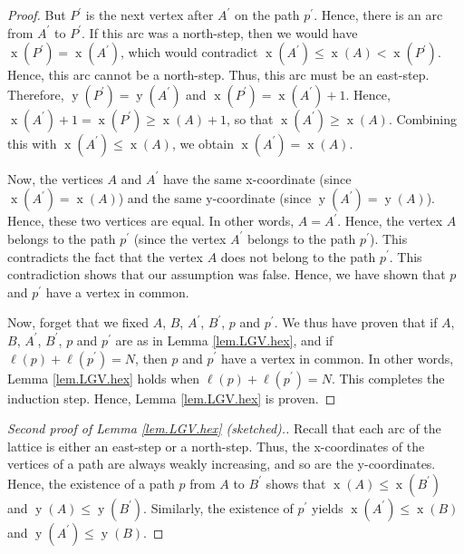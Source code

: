 \documentclass[reqno]{amsart}
\newcommand{\0}{\phantom{c}}
\newenvironment{verlong}{}{}
\theoremstyle{plain}
\theoremstyle{definition}
\numberwithin{equation}{section}
\begin{document}
\begin{verlong}
\begin{proof}
But $P^{\prime}$ is the next vertex after $A^{\prime}$ on the path $p^{\prime
}$. Hence, there is an arc from $A^{\prime}$ to $P^{\prime}$. If this arc was
a north-step, then we would have $\operatorname*{x}\left(  P^{\prime}\right)
=\operatorname*{x}\left(  A^{\prime}\right)  $, which would contradict
$\operatorname*{x}\left(  A^{\prime}\right)  \leq\operatorname*{x}\left(
A\right)  <\operatorname*{x}\left(  P^{\prime}\right)  $. Hence, this arc
cannot be a north-step. Thus, this arc must be an east-step. Therefore,
$\operatorname*{y}\left(  P^{\prime}\right)  =\operatorname*{y}\left(
A^{\prime}\right)  $ and $\operatorname*{x}\left(  P^{\prime}\right)
=\operatorname*{x}\left(  A^{\prime}\right)  +1$. Hence, $\operatorname*{x}%
\left(  A^{\prime}\right)  +1=\operatorname*{x}\left(  P^{\prime}\right)
\geq\operatorname*{x}\left(  A\right)  +1$, so that $\operatorname*{x}\left(
A^{\prime}\right)  \geq\operatorname*{x}\left(  A\right)  $. Combining this
with $\operatorname*{x}\left(  A^{\prime}\right)  \leq\operatorname*{x}\left(
A\right)  $, we obtain $\operatorname*{x}\left(  A^{\prime}\right)
=\operatorname*{x}\left(  A\right)  $.

Now, the vertices $A$ and $A^{\prime}$ have the same x-coordinate (since
$\operatorname*{x}\left(  A^{\prime}\right)  =\operatorname*{x}\left(
A\right)  $) and the same y-coordinate (since $\operatorname*{y}\left(
A^{\prime}\right)  =\operatorname*{y}\left(  A\right)  $). Hence, these two
vertices are equal. In other words, $A=A^{\prime}$. Hence, the vertex $A$
belongs to the path $p^{\prime}$ (since the vertex $A^{\prime}$ belongs to the
path $p^{\prime}$). This contradicts the fact that the vertex $A$ does not
belong to the path $p^{\prime}$. This contradiction shows that our assumption
was false. Hence, we have shown that $p$ and $p^{\prime}$ have a vertex in common.

Now, forget that we fixed $A$, $B$, $A^{\prime}$, $B^{\prime}$, $p$ and
$p^{\prime}$. We thus have proven that if $A$, $B$, $A^{\prime}$, $B^{\prime}%
$, $p$ and $p^{\prime}$ are as in Lemma \ref{lem.LGV.hex}, and if $\ell\left(
p\right)  +\ell\left(  p^{\prime}\right)  =N$, then $p$ and $p^{\prime}$ have
a vertex in common. In other words, Lemma \ref{lem.LGV.hex} holds when
$\ell\left(  p\right)  +\ell\left(  p^{\prime}\right)  =N$. This completes the
induction step. Hence, Lemma \ref{lem.LGV.hex} is proven.
\end{proof}

\begin{proof}
[Second proof of Lemma \ref{lem.LGV.hex} (sketched).]Recall that each arc of
the lattice is either an east-step or a north-step. Thus, the x-coordinates of
the vertices of a path are always weakly increasing, and so are the
y-coordinates. Hence, the existence of a path $p$ from $A$ to $B^{\prime}$
shows that $\operatorname*{x}\left(  A\right)  \leq\operatorname*{x}\left(
B^{\prime}\right)  $ and $\operatorname*{y}\left(  A\right)  \leq
\operatorname*{y}\left(  B^{\prime}\right)  $. Similarly, the existence of
$p^{\prime}$ yields $\operatorname*{x}\left(  A^{\prime}\right)
\leq\operatorname*{x}\left(  B\right)  $ and $\operatorname*{y}\left(
A^{\prime}\right)  \leq\operatorname*{y}\left(  B\right)  $.


\end{proof}
\end{verlong}
\end{document}

